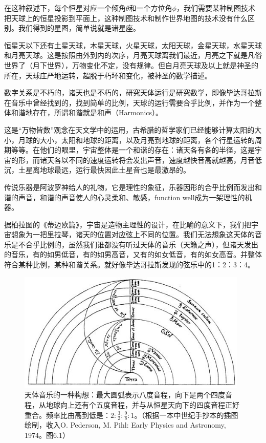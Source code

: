 在这种叙述下，每个恒星对应一个倾角$\theta $和一个方位角$\phi $，我们需要某种制图技术把天球上的恒星投影到平面上，这种制图技术和制作世界地图的技术没有什么区别。我们得到的星图，简单说就是诸星座。

恒星天以下还有土星天球，木星天球，火星天球，太阳天球，金星天球，水星天球和月亮天球。这是按照由外到内的次序，月亮天球离我们最近，月亮之下就是凡俗世界了（月下世界），万物变化不定，没有规律。但自月亮天球及以上就是神圣的所在，天球庄严地运转，超脱于朽坏和变化，被神圣的数学描述。

数字关系是不朽的，诸天也是不朽的，研究天体运行是研究数学，即像毕达哥拉斯在音乐中曾经找到的，找到简单的比例，天球的运行需要合乎比例，并作为一个整体和谐地存在，所谓和谐就是和声（Harmonics）。

这是“万物皆数”观念在天文学中的运用，古希腊的哲学家们已经能够计算太阳的大小，月球的大小，太阳和地球的距离，以及月亮到地球的距离，各个行星运转的周期等等。在他们的眼里，宇宙整体是一个和谐的存在：诸天各有各的半径，这是宇宙的形，而诸天各以不同的速度运转将会发出声音，速度越快音高就越高，月音低沉，土星离地球最远，运行最快因此土星音也是最激昂的。

传说乐器是阿波罗神给人的礼物，它是理性的象征，乐器因形的合乎比例而发出和谐的声音，和谐的声音使人的心灵柔和、敏感，function well成为一架理性的机器。

据柏拉图的《蒂迈欧篇》，宇宙是造物主理性的设计，在比喻的意义下，我们把宇宙想象为一把里拉琴，诸天的位置对应弦上不同的位置。我们无法想象这天体的音乐是不合乎比例的，虽然我们谁都没有听过天体的音乐（天籁之声），但诸天发出的音乐，有的如男低音，有的如男高音，又有的如女低音，有的如女高音。并整体符合某种比例，某种和谐关系。就好像毕达哥拉斯发现的弦乐中的1：2：3：4。

\begin{figure}[htbp]
\begin{center}
\includegraphics[width=11cm]{Preface/planetoctave1.jpg}
\caption{天体音乐的一种构想：最大圆弧表示八度音程，向下是两个四度音程，从地球向上还有个五度音程，并与从恒星天向下的四度音程正好重合。频率比由高到低是：$2: \frac{3}{2} : \frac{9}{8} : 1$。（根据一本中世纪手抄本的插图绘制，收入O. Pederson, M. Pihl: Early Physics and Astronomy, 1974。图6.1）}
\end{center}
\end{figure}

